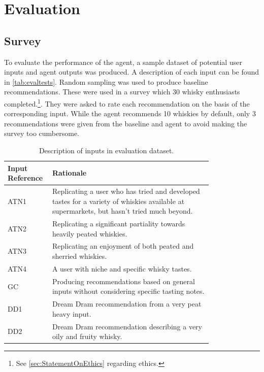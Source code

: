 \section{Evaluation}\label{sec:eval}
\subsection{Survey}\label{sec:survey}
To evaluate the performance of the agent, a sample dataset of potential user inputs and agent outputs 
was produced.  A description of each input can be found in \autoref{tab:evaltests}. Random sampling 
was used to produce baseline recommendations.  These were 
used in a survey which 30 whisky enthusiasts completed.\footnote{See \autoref{sec:StatementOnEthics}
regarding ethics.}.
They were asked to rate each recommendation on the basis of the corresponding input.  
While the agent recommends 10 whiskies by default, only 3 recommendations were given from the baseline and agent
to avoid making the survey too cumbersome.

\begin{table}
    \centering
    \caption{Description of inputs in evaluation dataset.}\label{tab:evaltests}
    \begin{tabular}{p{0.1\linewidth} p{0.7\linewidth}} 
    \toprule
    Input Reference & Rationale                                                                                                                                 \\ 
    \hline
    ATN1            & Replicating a user who has tried and developed tastes for a variety of whiskies available at supermarkets, but hasn't tried much beyond.  \\
    ATN2            & Replicating a significant partiality towards heavily peated whiskies.                                                                     \\
    ATN3            & Replicating an enjoyment of both peated and sherried whiskies.                                                                            \\
    ATN4            & A user with niche and specific whisky tastes.                                                                                             \\
    GC              & Producing recommendations based on general inputs without considering specific tasting notes.                                            \\
    DD1             & Dream Dram recommendation from a very peat heavy input.                                                                                   \\
    DD2             & Dream Dram recommendation describing a very oily and fruity whisky.                                                                       \\
    \bottomrule
    \end{tabular}
\end{table}

